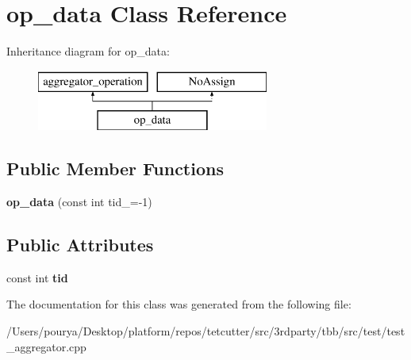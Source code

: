 \hypertarget{classop__data}{}\section{op\+\_\+data Class Reference}
\label{classop__data}
Inheritance diagram for op\+\_\+data\+:\begin{figure}[H]
\begin{center}
\leavevmode
\includegraphics[height=2.000000cm]{classop__data}
\end{center}
\end{figure}
\subsection*{Public Member Functions}
\begin{DoxyCompactItemize}
\item 
\hypertarget{classop__data_af29aaf0c0665f5a000cf5c0881bc91f3}{}{\bfseries op\+\_\+data} (const int tid\+\_\+=-\/1)\label{classop__data_af29aaf0c0665f5a000cf5c0881bc91f3}

\end{DoxyCompactItemize}
\subsection*{Public Attributes}
\begin{DoxyCompactItemize}
\item 
\hypertarget{classop__data_a1dcbbb58cc12951259b17ce61d321854}{}const int {\bfseries tid}\label{classop__data_a1dcbbb58cc12951259b17ce61d321854}

\end{DoxyCompactItemize}


The documentation for this class was generated from the following file\+:\begin{DoxyCompactItemize}
\item 
/\+Users/pourya/\+Desktop/platform/repos/tetcutter/src/3rdparty/tbb/src/test/test\+\_\+aggregator.\+cpp\end{DoxyCompactItemize}
